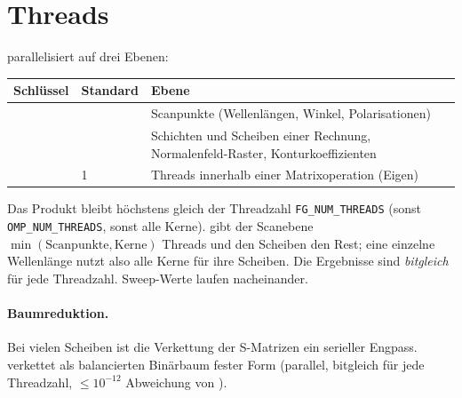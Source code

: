 \section{Threads}\label{sec:threads}
%
\FG{} parallelisiert auf drei Ebenen:
\begin{center}
\small
\begin{tabularx}{\linewidth}{llY}
\toprule
Schlüssel & Standard & Ebene \\
\midrule
{} &  & Scanpunkte (Wellenlängen, Winkel, Polarisationen) \\
 &  & Schichten und Scheiben einer Rechnung, Normalenfeld-Raster, Konturkoeffizienten \\
 & 1 & Threads innerhalb einer Matrixoperation (Eigen) \\
\bottomrule
\end{tabularx}
\end{center}
Das Produkt bleibt höchstens gleich der Threadzahl \texttt{FG\_NUM\_THREADS} (sonst \texttt{OMP\_NUM\_THREADS}, sonst
alle Kerne).  gibt der Scanebene $\min(\text{Scanpunkte},\text{Kerne})$ Threads und den Scheiben den Rest;
eine einzelne Wellenlänge nutzt also alle Kerne für ihre Scheiben. Die Ergebnisse sind \emph{bitgleich} für jede
Threadzahl. Sweep-Werte laufen nacheinander.

\paragraph{Baumreduktion.} Bei vielen Scheiben ist die Verkettung der S-Matrizen ein serieller Engpass.
 verkettet als balancierten Binärbaum fester Form (parallel, bitgleich für jede
Threadzahl, $\le10^{-12}$ Abweichung von ).

